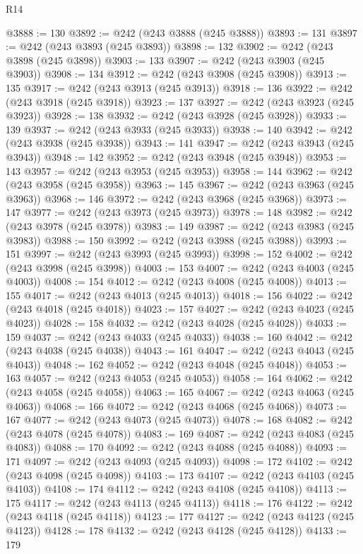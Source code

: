 \begin{lexlean}{R14}
\begin{coremodule}
{{{{{{{{{{{{{{{{{{{{{{{{{{{{{{{{{{{{{{{{{{{{{{{{{{{{{{{{{{{{{{{{{{{{{{{{{{{{{{{{{{@3888 := 130
@3892 := @242 (@243 @3888 (@245 @3888))
@3893 := 131
@3897 := @242 (@243 @3893 (@245 @3893))
@3898 := 132
@3902 := @242 (@243 @3898 (@245 @3898))
@3903 := 133
@3907 := @242 (@243 @3903 (@245 @3903))
@3908 := 134
@3912 := @242 (@243 @3908 (@245 @3908))
@3913 := 135
@3917 := @242 (@243 @3913 (@245 @3913))
@3918 := 136
@3922 := @242 (@243 @3918 (@245 @3918))
@3923 := 137
@3927 := @242 (@243 @3923 (@245 @3923))
@3928 := 138
@3932 := @242 (@243 @3928 (@245 @3928))
@3933 := 139
@3937 := @242 (@243 @3933 (@245 @3933))
@3938 := 140
@3942 := @242 (@243 @3938 (@245 @3938))
@3943 := 141
@3947 := @242 (@243 @3943 (@245 @3943))
@3948 := 142
@3952 := @242 (@243 @3948 (@245 @3948))
@3953 := 143
@3957 := @242 (@243 @3953 (@245 @3953))
@3958 := 144
@3962 := @242 (@243 @3958 (@245 @3958))
@3963 := 145
@3967 := @242 (@243 @3963 (@245 @3963))
@3968 := 146
@3972 := @242 (@243 @3968 (@245 @3968))
@3973 := 147
@3977 := @242 (@243 @3973 (@245 @3973))
@3978 := 148
@3982 := @242 (@243 @3978 (@245 @3978))
@3983 := 149
@3987 := @242 (@243 @3983 (@245 @3983))
@3988 := 150
@3992 := @242 (@243 @3988 (@245 @3988))
@3993 := 151
@3997 := @242 (@243 @3993 (@245 @3993))
@3998 := 152
@4002 := @242 (@243 @3998 (@245 @3998))
@4003 := 153
@4007 := @242 (@243 @4003 (@245 @4003))
@4008 := 154
@4012 := @242 (@243 @4008 (@245 @4008))
@4013 := 155
@4017 := @242 (@243 @4013 (@245 @4013))
@4018 := 156
@4022 := @242 (@243 @4018 (@245 @4018))
@4023 := 157
@4027 := @242 (@243 @4023 (@245 @4023))
@4028 := 158
@4032 := @242 (@243 @4028 (@245 @4028))
@4033 := 159
@4037 := @242 (@243 @4033 (@245 @4033))
@4038 := 160
@4042 := @242 (@243 @4038 (@245 @4038))
@4043 := 161
@4047 := @242 (@243 @4043 (@245 @4043))
@4048 := 162
@4052 := @242 (@243 @4048 (@245 @4048))
@4053 := 163
@4057 := @242 (@243 @4053 (@245 @4053))
@4058 := 164
@4062 := @242 (@243 @4058 (@245 @4058))
@4063 := 165
@4067 := @242 (@243 @4063 (@245 @4063))
@4068 := 166
@4072 := @242 (@243 @4068 (@245 @4068))
@4073 := 167
@4077 := @242 (@243 @4073 (@245 @4073))
@4078 := 168
@4082 := @242 (@243 @4078 (@245 @4078))
@4083 := 169
@4087 := @242 (@243 @4083 (@245 @4083))
@4088 := 170
@4092 := @242 (@243 @4088 (@245 @4088))
@4093 := 171
@4097 := @242 (@243 @4093 (@245 @4093))
@4098 := 172
@4102 := @242 (@243 @4098 (@245 @4098))
@4103 := 173
@4107 := @242 (@243 @4103 (@245 @4103))
@4108 := 174
@4112 := @242 (@243 @4108 (@245 @4108))
@4113 := 175
@4117 := @242 (@243 @4113 (@245 @4113))
@4118 := 176
@4122 := @242 (@243 @4118 (@245 @4118))
@4123 := 177
@4127 := @242 (@243 @4123 (@245 @4123))
@4128 := 178
@4132 := @242 (@243 @4128 (@245 @4128))
@4133 := 179
}}}}}}}}}}}}}}}}}}}}}}}}}}}}}}}}}}}}}}}}}}}}}}}}}}}}}}}}}}}}}}}}}}}}}}}}}}}}}}}}}}
\end{coremodule}
\end{lexlean}

